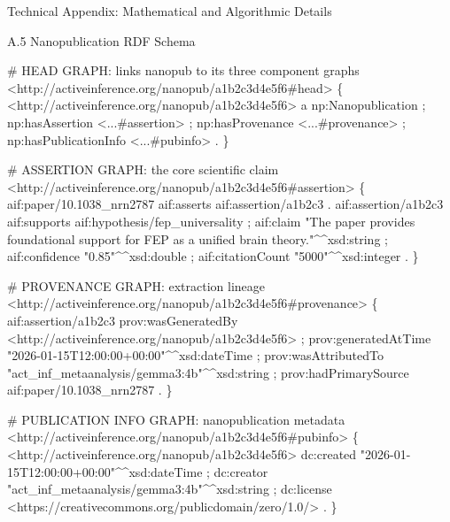 \documentclass[
  ignorenonframetext,
]{beamer}
\newenvironment{Shaded}{}{}
\newcommand{\NormalTok}[1]{#1}
\begin{document}
\begin{frame}[fragile]{Technical Appendix: Mathematical and Algorithmic
Details \label{sec:technical_appendix}}
\begin{block}{A.5 Nanopublication RDF Schema}
\begin{Shaded}
\begin{Highlighting}[]
\NormalTok{\# HEAD GRAPH: links nanopub to its three component graphs}
\NormalTok{\textless{}http://activeinference.org/nanopub/a1b2c3d4e5f6\#head\textgreater{} \{}
\NormalTok{  \textless{}http://activeinference.org/nanopub/a1b2c3d4e5f6\textgreater{}}
\NormalTok{    a np:Nanopublication ;}
\NormalTok{    np:hasAssertion   \textless{}...\#assertion\textgreater{} ;}
\NormalTok{    np:hasProvenance   \textless{}...\#provenance\textgreater{} ;}
\NormalTok{    np:hasPublicationInfo \textless{}...\#pubinfo\textgreater{} .}
\NormalTok{\}}

\NormalTok{\# ASSERTION GRAPH: the core scientific claim}
\NormalTok{\textless{}http://activeinference.org/nanopub/a1b2c3d4e5f6\#assertion\textgreater{} \{}
\NormalTok{  aif:paper/10.1038\_nrn2787 aif:asserts aif:assertion/a1b2c3 .}
\NormalTok{  aif:assertion/a1b2c3}
\NormalTok{    aif:supports aif:hypothesis/fep\_universality ;}
\NormalTok{    aif:claim "The paper provides foundational support for FEP as a}
\NormalTok{               unified brain theory."\^{}\^{}xsd:string ;}
\NormalTok{    aif:confidence "0.85"\^{}\^{}xsd:double ;}
\NormalTok{    aif:citationCount "5000"\^{}\^{}xsd:integer .}
\NormalTok{\}}

\NormalTok{\# PROVENANCE GRAPH: extraction lineage}
\NormalTok{\textless{}http://activeinference.org/nanopub/a1b2c3d4e5f6\#provenance\textgreater{} \{}
\NormalTok{  aif:assertion/a1b2c3}
\NormalTok{    prov:wasGeneratedBy  \textless{}http://activeinference.org/nanopub/a1b2c3d4e5f6\textgreater{} ;}
\NormalTok{    prov:generatedAtTime "2026{-}01{-}15T12:00:00+00:00"\^{}\^{}xsd:dateTime ;}
\NormalTok{    prov:wasAttributedTo "act\_inf\_metaanalysis/gemma3:4b"\^{}\^{}xsd:string ;}
\NormalTok{    prov:hadPrimarySource aif:paper/10.1038\_nrn2787 .}
\NormalTok{\}}

\NormalTok{\# PUBLICATION INFO GRAPH: nanopublication metadata}
\NormalTok{\textless{}http://activeinference.org/nanopub/a1b2c3d4e5f6\#pubinfo\textgreater{} \{}
\NormalTok{  \textless{}http://activeinference.org/nanopub/a1b2c3d4e5f6\textgreater{}}
\NormalTok{    dc:created "2026{-}01{-}15T12:00:00+00:00"\^{}\^{}xsd:dateTime ;}
\NormalTok{    dc:creator "act\_inf\_metaanalysis/gemma3:4b"\^{}\^{}xsd:string ;}
\NormalTok{    dc:license \textless{}https://creativecommons.org/publicdomain/zero/1.0/\textgreater{} .}
\NormalTok{\}}
\end{Highlighting}
\end{Shaded}


\end{block}
\end{frame}
\end{document}
